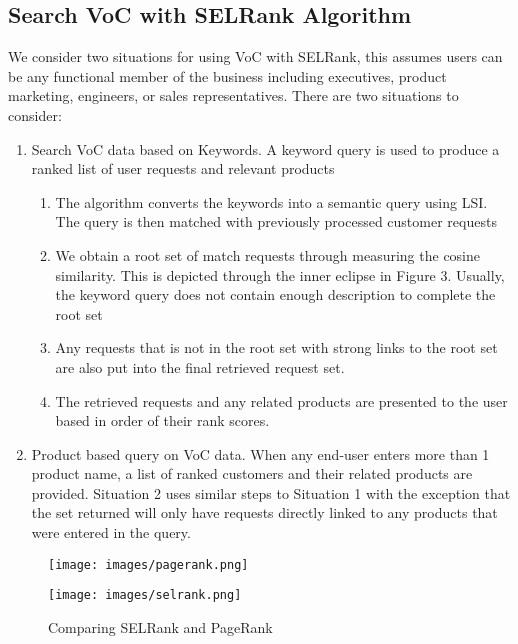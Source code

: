 \documentclass[sigconf]{acmart}
\begin{document}
\subsection{Search VoC with SELRank Algorithm}
We consider two situations for using VoC with SELRank, this assumes users can be any functional  member of the business including executives, product marketing, engineers, or sales representatives. There are two situations to consider:

\begin{enumerate}
    \item Search VoC data based on Keywords. A keyword query is used to produce a ranked list of user requests and relevant products
    \begin{enumerate}
        \item The algorithm converts the keywords into a semantic query using LSI. The query is then matched with previously processed customer requests
        \item We obtain a root set of match requests through measuring the cosine similarity. This is depicted through the inner eclipse in Figure 3. Usually, the keyword query does not contain enough description to complete the root set
        \item Any requests that is not in the root set with strong links to the root set are also put into the final retrieved request set. 
        \item The retrieved requests and any related products are presented to the user based in order of their rank scores. 
    \end{enumerate}
    \item Product based query on VoC data. When any end-user enters more than 1 product name, a list of ranked customers and their related products are provided. Situation 2 uses similar steps to Situation 1 with the exception that the set returned will only have requests directly linked to any products that were entered in the query. 
\end{enumerate}

\begin{figure}
    \centering
    \texttt{[image: images/pagerank.png]}
\end{figure}

\begin{figure}
    \centering
    \texttt{[image: images/selrank.png]}
    \caption{Comparing SELRank and PageRank}
    \label{fig:4}
\end{figure}
\end{document}
